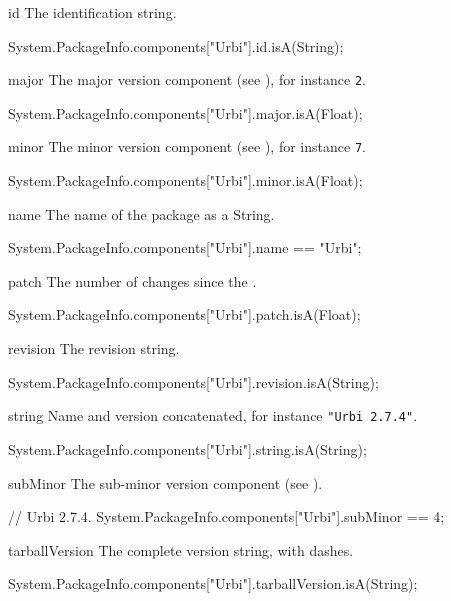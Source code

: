 \begin{urbiscriptapi}
\item[id] The identification string.
\begin{urbiassert}
System.PackageInfo.components["Urbi"].id.isA(String);
\end{urbiassert}


\item[major] The major version component (see ), for
  instance \lstinline|2|.
\begin{urbiassert}
System.PackageInfo.components["Urbi"].major.isA(Float);
\end{urbiassert}


\item[minor] The minor version component (see ), for
  instance \lstinline|7|.
\begin{urbiassert}
System.PackageInfo.components["Urbi"].minor.isA(Float);
\end{urbiassert}


\item[name] The name of the package as a String.
\begin{urbiassert}
System.PackageInfo.components["Urbi"].name
  == "Urbi";
\end{urbiassert}


\item[patch] The number of changes since the .
\begin{urbiassert}
System.PackageInfo.components["Urbi"].patch.isA(Float);
\end{urbiassert}


\item[revision] The revision string.
\begin{urbiassert}
System.PackageInfo.components["Urbi"].revision.isA(String);
\end{urbiassert}


\item[string] Name and version concatenated, for instance
  \lstinline|"Urbi 2.7.4"|.
\begin{urbiassert}
System.PackageInfo.components["Urbi"].string.isA(String);
\end{urbiassert}


\item[subMinor] The sub-minor version component (see ).
\begin{urbiassert}
// Urbi 2.7.4.
System.PackageInfo.components["Urbi"].subMinor
  == 4;
\end{urbiassert}


\item[tarballVersion] The complete version string, with dashes.
\begin{urbiassert}
System.PackageInfo.components["Urbi"].tarballVersion.isA(String);
\end{urbiassert}



\end{urbiscriptapi}
